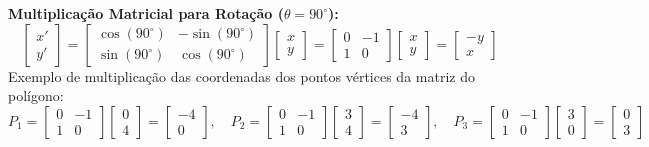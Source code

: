 \documentclass[12pt]{article}
\begin{document}
\vspace{0.2cm}
\noindent
\textbf{Multiplicação Matricial para Rotação ($\theta = 90^\circ$):}
\[
\begin{bmatrix} x' \\ y' \end{bmatrix} = 
\begin{bmatrix} \cos(90^\circ) & -\sin(90^\circ) \\ \sin(90^\circ) & \cos(90^\circ) \end{bmatrix} \begin{bmatrix} x \\ y \end{bmatrix} = 
\begin{bmatrix} 0 & -1 \\ 1 & 0 \end{bmatrix} \begin{bmatrix} x \\ y \end{bmatrix} = 
\begin{bmatrix} -y \\ x \end{bmatrix}
\]
\noindent
Exemplo de multiplicação das coordenadas dos pontos vértices da matriz do polígono:
\[
P_1 = \begin{bmatrix} 0 & -1 \\ 1 & 0 \end{bmatrix} \begin{bmatrix} 0 \\ 4 \end{bmatrix} = \begin{bmatrix} -4 \\ 0 \end{bmatrix}, \quad
P_2 = \begin{bmatrix} 0 & -1 \\ 1 & 0 \end{bmatrix} \begin{bmatrix} 3 \\ 4 \end{bmatrix} = \begin{bmatrix} -4 \\ 3 \end{bmatrix}, \quad
P_3 = \begin{bmatrix} 0 & -1 \\ 1 & 0 \end{bmatrix} \begin{bmatrix} 3 \\ 0 \end{bmatrix} = \begin{bmatrix} 0 \\ 3 \end{bmatrix}
\]
\end{document}
